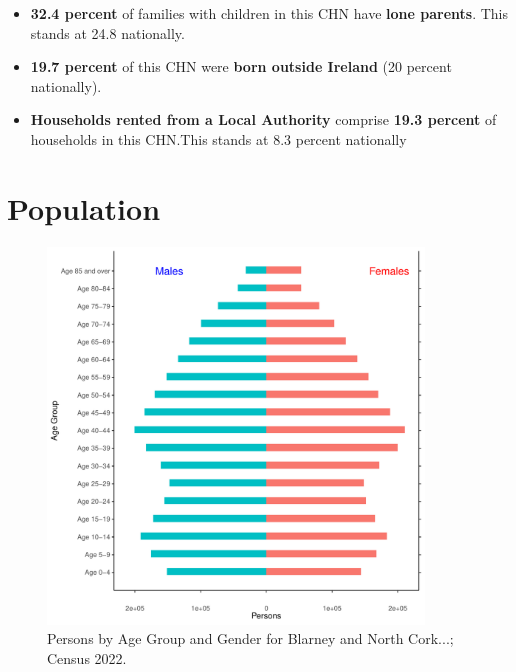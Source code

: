 \documentclass{article}
\begin{document}
\begin{itemize}
\item \textbf{32.4 percent} of families with children in this CHN have \textbf{lone parents}. This stands at 24.8 nationally.

\item \textbf{19.7 percent} of this CHN were \textbf{born outside Ireland} (20 percent nationally).

\item \textbf{Households rented from a Local Authority} comprise \textbf{19.3 percent} of households in this CHN.This stands at 8.3 percent nationally

\end{itemize}

\pagebreak

\section{Population} 
\label{sect:Pop}

\begin{figure}[h]
	\centering
	\includegraphics[width = 100mm]{../figures/PyramidPlot.pdf}
	\caption{Persons by Age Group and Gender for Blarney and North Cork...; Census 2022.}
	\label{fig:2ae19629-1a6a-13a3-e055-000000000001}
	\end{figure}
\end{document}
